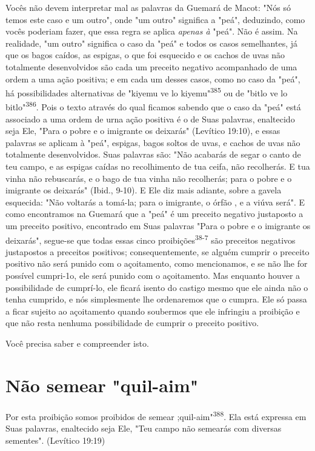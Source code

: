 \begin{itemize}
\begin{enumrate}
\begin{itemize}
\begin{itemize}
\begin{itemize}
Vocês não devem interpretar mal as palavras da Guemará de Macot: "Nós só
temos este caso e um outro", onde "um outro" significa a "peá",
deduzindo, como vocês poderiam fazer, que essa regra se aplica
\emph{apenas à} "peá". Não é assim. Na realidade, "um outro" significa o
caso da "peá" e todos os casos semelhantes, já que os bagos caídos, as
espigas, o que foi es­quecido e os cachos de uvas não totalmente
desenvolvidos são cada um pre­ceito negativo acompanhado de uma ordem a
uma ação positiva; e em cada um desses casos, como no caso da "peá", há
possibilidades alternativas de "kiyemu ve lo
kiyemu"\textsuperscript{385} ou de "bitlo ve lo
bitlo"\textsuperscript{386}. Pois o texto através do qual ficamos
sabendo que o caso da "peá" está associado a uma ordem de urna ação
positiva é o de Suas palavras, enaltecido seja Ele, "Para o pobre e o
imigrante os deixarás" (Levítico 19:10), e essas palavras se aplicam à
"peá", espigas, bagos soltos de uvas, e cachos de uvas não totalmente
desenvolvidos. Suas palavras são: "Não acabarás de segar o canto de teu
campo, e as espigas caídas no recolhimento de tua ceifa, não recolherás.
E tua vinha não rebusca­rás, e o bago de tua vinha não recolherás; para
o pobre e o imigrante os deixa­rás" (Ibid., 9-10). E Ele diz mais
adiante, sobre a gavela esquecida: "Não volta­rás a tomá-la; para o
imigrante, o órfão , e a viúva será". E como encontramos na Guemará que
a "peá" é um preceito negativo justaposto a um preceito positivo,
encontrado em Suas palavras "Para o pobre e o imigrante os deixa­rás",
segue-se que todas essas cinco proibições\textsuperscript{38-7} são
preceitos negativos jus­tapostos a preceitos positivos;
consequentemente, se alguém cumprir o pre­ceito positivo não será punido
com o açoitamento, como mencionamos, e se não lhe for possível
cumpri-1o, ele será punido com o açoitamento. Mas enquanto houver a
possibilidade de cumprí-lo, ele ficará isento do castigo mesmo que ele
ainda não o tenha cumprido, e nós simplesmente lhe ordena­remos que o
cumpra. Ele só passa a ficar sujeito ao açoitamento quando sou­bermos
que ele infringiu a proibição e que não resta nenhuma possibilidade de
cumprir o preceito positivo.

Você precisa saber e compreender isto.

\section{Não semear "quil-aim"}

Por esta proibição somos proibidos de semear
;quil-aim"\textsuperscript{388}. Ela es­tá expressa em Suas palavras,
enaltecido seja Ele, "Teu campo não semearás com diversas
sementes". (Levítico 19:19)


\end{itemize}
\end{itemize}
\end{itemize}
\end{enumrate}
\end{itemize}
